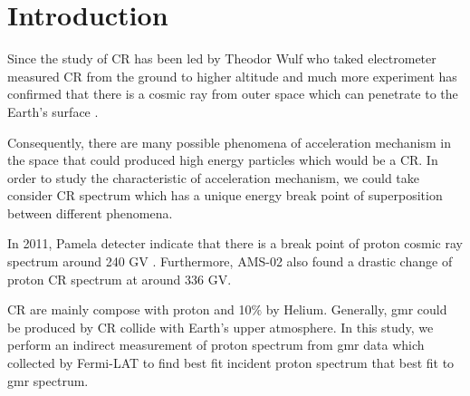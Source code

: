 \chapter{Introduction}

\par Since the study of \acf{CR} has been led by Theodor Wulf who taked electrometer measured \acf{CR} from the ground to higher altitude and much more experiment has confirmed that there is a cosmic ray from outer space which can penetrate to the Earth's surface \cite{HESS,Pacini,Clay}.

\par Consequently, there are many possible phenomena of acceleration mechanism in the space that could produced high energy particles which would be a \acs{CR}. In order to study the characteristic of acceleration mechanism, we could take consider \acs{CR} spectrum which has a unique energy break point of superposition between different phenomena.

In 2011, \acs{Pamela} detecter indicate that there is a break point of proton cosmic ray spectrum around 240 GV \cite{PAMELA}. Furthermore, AMS-02 also found a drastic change of proton CR spectrum at around 336 GV. \cite{AMS-02}
\par \acs{CR} are mainly compose with proton and 10$\%$ by Helium. Generally, \acf{gmr} could be produced by \acs{CR} collide with Earth's upper atmosphere. In this study, we perform an indirect measurement of proton spectrum from \acs{gmr} data which collected by \acf{Fermi-LAT} to find best fit incident proton spectrum that best fit to \acs{gmr} spectrum.
